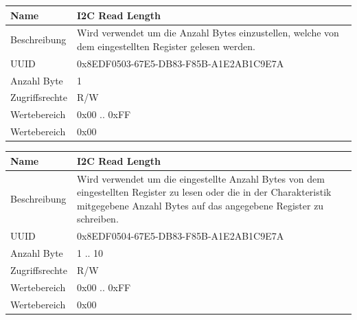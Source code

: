 \begin{tabularx}{\textwidth}{|l|X|}
\hline
Name & I2C Read Length                              \\
\hline
Beschreibung & Wird verwendet um die Anzahl Bytes einzustellen, welche von dem eingestellten Register gelesen werden. \\
\hline
UUID	&    0x8EDF0503-67E5-DB83-F85B-A1E2AB1C9E7A \\
\hline     
Anzahl Byte	&    1  \\
\hline      
Zugriffsrechte	&   R/W  \\
\hline        
Wertebereich	&   0x00 .. 0xFF \\
\hline          
Wertebereich	&   0x00 \\
\hline                                     
\end{tabularx}

\begin{tabularx}{\textwidth}{|l|X|}
\hline
Name & I2C Read Length                              \\
\hline
Beschreibung & Wird verwendet um die eingestellte Anzahl Bytes von dem eingestellten Register zu lesen oder die in der Charakteristik mitgegebene Anzahl Bytes auf das angegebene Register zu schreiben.\\
\hline
UUID	&    0x8EDF0504-67E5-DB83-F85B-A1E2AB1C9E7A \\
\hline     
Anzahl Byte	&    1 .. 10  \\
\hline      
Zugriffsrechte	&   R/W  \\
\hline        
Wertebereich	&   0x00 .. 0xFF \\
\hline          
Wertebereich	&   0x00 \\
\hline                                     
\end{tabularx}
